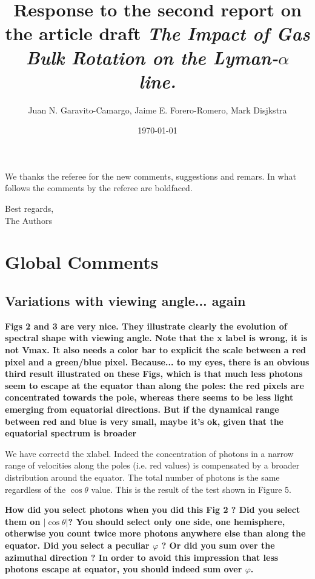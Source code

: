 \documentclass[12pt]{article}
\title{Response to the second report on the article draft \emph{The
    Impact of Gas Bulk Rotation on the Lyman-$\alpha$ line.}}
\author{Juan N. Garavito-Camargo, Jaime E. Forero-Romero, Mark Disjkstra}
\date{\today}
\begin{document}
\maketitle

We thanks the referee for the new comments, suggestions and remars.
In what follows the comments by the referee are boldfaced.

Best regards, \\

The Authors\\


\section*{Global Comments}

\subsection*{Variations with viewing angle... again}

{\bf Figs 2 and 3 are very nice. They illustrate clearly the evolution
  of spectral shape with viewing angle. Note that the x label is
  wrong, it is not Vmax. It also needs a color bar to explicit the
  scale between a red pixel and a green/blue pixel. Because... to my
  eyes, there is an obvious third result illustrated on these Figs,
  which is that much less photons seem to escape at the equator than
  along the poles: the red pixels are concentrated towards the pole,
  whereas there seems to be less light emerging from equatorial
  directions. But if the dynamical range between red and blue is very
  small, maybe it’s ok, given that the equatorial spectrum is
  broader}

We have correctd the xlabel. Indeed the concentration of photons in a
narrow range of velocities along the poles (i.e. red values) is
compensated by a broader distribution around the equator. The total
number of photons is the same regardless of the $\cos\theta$
value. This is the result of the test shown in Figure 5. 




{\bf How did you select photons when you did this Fig 2 ? Did you
  select them on $|\cos\theta|$? You should select only one side, one
  hemisphere, otherwise you count twice more photons anywhere else
  than along the equator. Did you select a peculiar $\varphi$ ? Or did
  you sum over the azimuthal direction ? In order to avoid this
  impression that less photons escape at equator, you should indeed
  sum over $\varphi$. }
\end{document}
